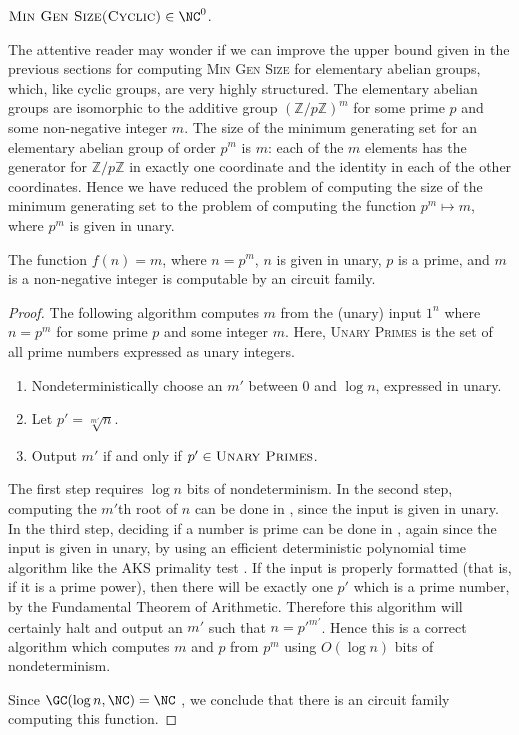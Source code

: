 \documentclass{article}
\begin{document}
\begin{theorem}
  $\textsc{Min Gen Size(Cyclic)} \in \NC^0$.
\end{theorem}

The attentive reader may wonder if we can improve the upper bound given in the previous sections for computing \textsc{Min Gen Size} for elementary abelian groups, which, like cyclic groups, are very highly structured.
The elementary abelian groups are isomorphic to the additive group $(\mathbb{Z}/p\mathbb{Z})^m$ for some prime $p$ and some non-negative integer $m$.
The size of the minimum generating set for an elementary abelian group of order $p^m$ is $m$: each of the $m$ elements has the generator for $\mathbb{Z}/p\mathbb{Z}$ in exactly one coordinate and the identity in each of the other coordinates.
Hence we have reduced the problem of computing the size of the minimum generating set to the problem of computing the function $p^m \mapsto m$, where $p^m$ is given in unary.


\begin{lemma}
  The function $f(n) = m$, where $n = p^m$, $n$ is given in unary, $p$ is a prime, and $m$ is a non-negative integer is computable by an \NC{} circuit family.
\end{lemma}
\begin{proof}
  The following algorithm computes $m$ from the (unary) input $1^n$ where $n = p^m$ for some prime $p$ and some integer $m$.
  Here, \textsc{Unary Primes} is the set of all prime numbers expressed as unary integers.
  \begin{enumerate}
  \item Nondeterministically choose an $m'$ between 0 and $\log n$, expressed in unary.
  \item Let $p' = \sqrt[m']{n}$.
  \item Output $m'$ if and only if $p' \in \textsc{Unary Primes}$.
  \end{enumerate}
  The first step requires $\log n$ bits of nondeterminism.
  In the second step, computing the $m'$th root of $n$ can be done in \NC{}, since the input is given in unary.
  In the third step, deciding if a number is prime can be done in \NC{}, again since the input is given in unary, by using an efficient deterministic polynomial time algorithm like the AKS primality test \cite{aks04}.
  If the input is properly formatted (that is, if it is a prime power), then there will be exactly one $p'$ which is a prime number, by the Fundamental Theorem of Arithmetic.
  Therefore this algorithm will certainly halt and output an $m'$ such that $n = {p'}^{m'}$.
  Hence this is a correct \NC{} algorithm which computes $m$ and $p$ from $p^m$ using $O(\log n)$ bits of nondeterminism.

  Since $\GC(\log n, \NC) = \NC$ \cite[Theorem~2.3]{wolf94}, we conclude that there is an \NC{} circuit family computing this function.
\end{proof}
\end{document}
